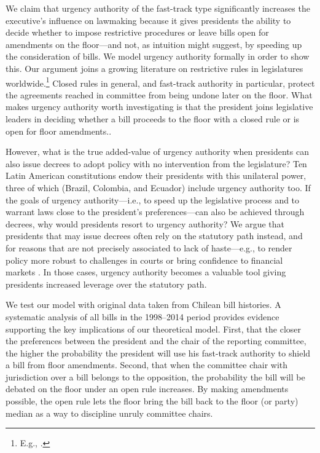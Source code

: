 \documentclass[letter,12pt]{article}
\begin{document}
We claim that urgency authority of the fast-track type significantly increases the executive’s influence on lawmaking because it gives presidents the ability to decide whether to impose restrictive procedures or leave bills open for amendments on the floor—and not, as intuition might suggest, by speeding up the consideration of bills. We model urgency authority formally in order to show this. Our argument joins a growing literature on restrictive rules in legislatures worldwide.\footnote{E.g., \citet{dion.huber.1996,doring.restrictiveRules.2003,huber.1996b,krehbielRestrictiveRules1997,heller.2001,weingast.1992,schickler.richRules1997,cox.mccubbins.1997,amorim.cox.mccubbins.2003,calvo.2014argBook,sin.2014,denhartog.2004phd}.} Closed rules in general, and fast-track authority in particular, protect the agreements reached in committee from being undone later on the floor. What makes urgency authority worth investigating is that the president joins legislative leaders in deciding whether a bill proceeds to the floor with a closed rule or is open for floor amendments..

However, what is the true added-value of urgency authority when presidents can also issue decrees to adopt policy with no intervention from the legislature? Ten Latin American constitutions endow their presidents with this unilateral power, three of which (Brazil, Colombia, and Ecuador) include urgency authority too. If the goals of urgency authority—i.e., to speed up the legislative process and to warrant laws close to the president’s preferences—can also be achieved through decrees, why would presidents resort to urgency authority? We argue that presidents that may issue decrees often rely on the statutory path instead, and for reasons that are not precisely associated to lack of haste—e.g., to render policy more robust to challenges in courts or bring confidence to financial markets \citep[cf.][]{palanza.2019}. In those cases, urgency authority becomes a valuable tool giving presidents increased leverage over the statutory path.  

We test our model with original data taken from Chilean bill histories. A systematic analysis of all bills in the 1998–2014 period provides evidence supporting the key implications of our theoretical model. First, that the closer the preferences between the president and the chair of the reporting committee, the higher the probability the president will use his fast-track authority to shield a bill from floor amendments. Second, that when the committee chair with jurisdiction over a bill belongs to the opposition, the probability the bill will be debated on the floor under an open rule increases. By making amendments possible, the open rule lets the floor bring the bill back to the floor (or party) median as a way to discipline unruly committee chairs.
\end{document}
